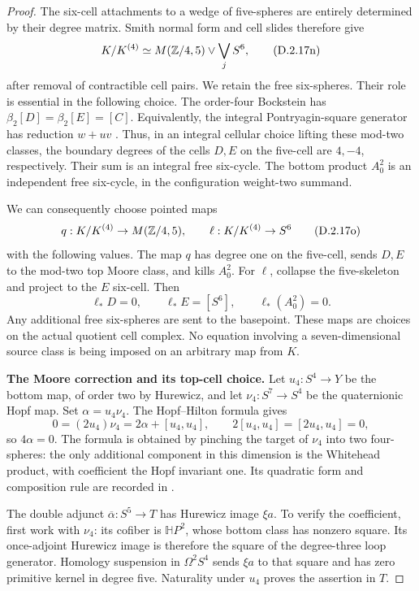 \begin{proof}
The six-cell attachments to a wedge of five-spheres are entirely
determined by their degree matrix. Smith normal form and cell
slides therefore give
\[
 K/K^{(4)}\simeq M(\mathbb Z/4,5)\vee\bigvee_j S^6,
 \tag{D.2.17n}
\]
after removal of contractible cell pairs. We retain the free
six-spheres. Their role is essential in the following choice.
The order-four Bockstein has
$\beta_2[D]=\beta_2[E]=[C]$. Equivalently, the integral
Pontryagin-square generator has reduction $w+uv$
\cite[\S2.3, p.~1336]{I_Mahowald1964}.
Thus, in an integral cellular choice lifting these mod-two
classes, the boundary degrees of the cells $D,E$ on the
five-cell are $4,-4$, respectively. Their sum is an integral
free six-cycle. The bottom product $A_0^2$ is an independent
free six-cycle, in the configuration weight-two summand.

We can consequently choose pointed maps
\[
 q:K/K^{(4)}\to M(\mathbb Z/4,5),\qquad
 \ell:K/K^{(4)}\to S^6
 \tag{D.2.17o}
\]
with the following values. The map $q$ has degree one on the
five-cell, sends $D,E$ to the mod-two top Moore class, and
kills $A_0^2$. For $\ell$, collapse the five-skeleton and project
to the $E$ six-cell. Then
\[
 \ell_*D=0,\qquad \ell_*E=[S^6],\qquad \ell_*(A_0^2)=0.
 \tag{D.2.17p}
\]
Any additional free six-spheres are sent to the basepoint.
These maps are choices on the actual quotient cell complex.
No equation involving a seven-dimensional source class is being
imposed on an arbitrary map from $K$.

\medskip\noindent
\textbf{The Moore correction and its top-cell choice.}
Let $u_4:S^4\to Y$ be the bottom map, of order two by Hurewicz,
and let $\nu_4:S^7\to S^4$ be the quaternionic Hopf map.
Set $\alpha=u_4\nu_4$. The Hopf--Hilton formula gives
\[
 0=(2u_4)\nu_4=2\alpha+[u_4,u_4],
 \qquad 2[u_4,u_4]=[2u_4,u_4]=0,
 \tag{D.2.17q}
\]
so $4\alpha=0$. The formula is obtained by pinching the target
of $\nu_4$ into two four-spheres: the only additional component
in this dimension is the Whitehead product, with coefficient
the Hopf invariant one. Its quadratic form and composition rule
are recorded in \cite[(8.2)(4), (8.4), and Lemma~8.5,
pp.~4756--4757]{I_Baues1996}.

The double adjunct $\overline\alpha:S^5\to T$ has Hurewicz
image $\xi a$. To verify the coefficient, first work with
$\nu_4$: its cofiber is $\mathbb HP^2$, whose bottom class has
nonzero square. Its once-adjoint Hurewicz image is therefore
the square of the degree-three loop generator. Homology
suspension in $\Omega^2S^4$ sends $\xi a$ to that square and
has zero primitive kernel in degree five. Naturality under
$u_4$ proves the assertion in $T$.


\end{proof}
